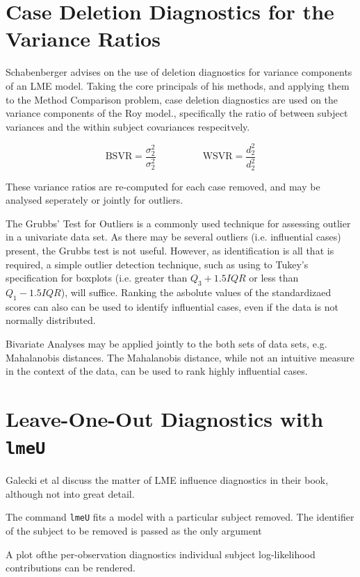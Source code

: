 \documentclass[12pt, a4paper]{report}
\theoremstyle{plain}
\theoremstyle{definition}
\theoremstyle{remark}
\begin{document}
\newpage
\section{Case Deletion Diagnostics for the Variance Ratios}

Schabenberger advises on the use of deletion diagnostics for variance components of an LME model.
Taking the core principals of his methods, and applying them to the Method Comparison problem, case deletion diagnostics are used on the variance components of the Roy model., specifically the ratio of between subject variances and the within subject covariances respecitvely.


\[ \mbox{BSVR} = \frac{\sigma^2_2}{\sigma^2_2} \phantom{makespace}  \mbox{WSVR} = \frac{d^2_2}{d^2_2} \]

These variance ratios are re-computed for each case removed, and may be analysed seperately or jointly for outliers. 

The Grubbs' Test for Outliers is a commonly used technique for assessing outlier in a univariate data set. As there may be several outliers (i.e. influential cases) present, the Grubbs test is not useful. However, as identification is all that is required, a simple outlier detection technique, such as using to Tukey's specification for boxplots (i.e. greater than $Q_3 +1.5 IQR$ or less than $Q_1 - 1.5 IQR$), will suffice. Ranking the asbolute values of the standardizaed scores can also can be used to identify influential cases, even if the data is not normally distributed.

Bivariate Analyses may be applied jointly to the both sets of data sets, e.g. Mahalanobis distances. The Mahalanobis distance, while not an intuitive measure in the context of the data, can be used to rank highly influential cases. 


\section*{Leave-One-Out Diagnostics with \texttt{lmeU}}
Galecki et al discuss the matter of LME influence diagnostics in their book, although not into great detail.


The command \texttt{lmeU} fits a model with a particular subject removed. The identifier of the subject to be removed is passed as the only argument

A plot ofthe per-observation diagnostics individual subject log-likelihood contributions can be rendered.
\end{document}
